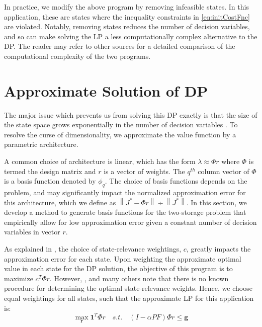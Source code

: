 \documentclass[conference]{IEEEtran}
\newcommand{\norm}[1]{\left\lVert#1\right\rVert}
\begin{document}
In practice, we modify the above program by removing infeasible states. In this application, these are states where the inequality constraints in \eqref{eq:initCostFnc} are violated. Notably, removing states reduces the number of decision variables, and so can make solving the LP a less computationally complex alternative to the DP. The reader may refer to other sources for a detailed comparison of the computational complexity of the two programs.




\section{Approximate Solution of DP}

The major issue which prevents us from solving this DP exactly is that the size of the state space grows exponentially in the number of decision variables \cite{deFarias:2003:LPA:970869.970918}. To resolve the curse of dimensionality, we approximate the value function by a parametric architecture. %

A common choice of architecture is linear, which has the form $\lambda\approx \Phi r$ where $\Phi$ is termed the design matrix and $r$ is a vector of weights. The $q^{th}$ column vector of $\Phi$ is a basis function denoted by $\phi_{q}$. The choice of basis functions depends on the problem, and may significantly impact the normalized approximation error for this architecture, which we define as $\norm{J^{*}-\Phi r}\div\norm{J^{*}}$. In this section, we develop a method to generate basis functions for the two-storage problem that empirically allow for low approximation error given a constant number of decision variables in vector $r$.

As explained in \cite{deFarias:2003:LPA:970869.970918}, the choice of state-relevance weightings, $c$, greatly impacts the approximation error for each state. Upon weighting the approximate optimal value in each state for the DP solution, the objective of this program is to maximize $c^{T}\Phi r$. However, \cite{deFarias:2003:LPA:970869.970918}, \cite{PatrascuReluEugen2004} and many others note that there is no known procedure for determining the optimal state-relevance weights. Hence, we choose equal weightings for all states, such that the approximate LP for this application is:
\begin{equation} \label{eq:ApproxLP}
    \max_{\boldsymbol{r}} \boldsymbol{1}^{T} \Phi r
    \hspace{1em}s.t.\hspace{1em}
    (I-\alpha PF)\Phi r \leq \boldsymbol{g}
\end{equation}
\end{document}
